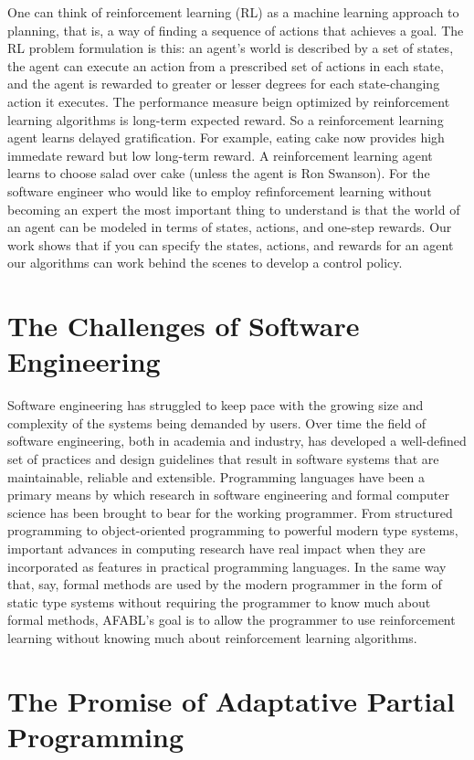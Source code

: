 One can think of reinforcement learning (RL) as a machine learning approach to planning, that is, a way of finding a sequence of actions that achieves a goal.  The RL problem formulation is this: an agent's world is described by a set of states, the agent can execute an action from a prescribed set of actions in each state, and the agent is rewarded to greater or lesser degrees for each state-changing action it executes. The performance measure beign optimized by reinforcement learning algorithms is long-term expected reward. So a reinforcement learning agent learns delayed gratification. For example, eating cake now provides high immedate reward but low long-term reward. A reinforcement learning agent learns to choose salad over cake (unless the agent is Ron Swanson). For the software engineer who would like to employ refinforcement learning without becoming an expert the most important thing to understand is that the world of an agent can be modeled in terms of states, actions, and one-step rewards. Our work shows that if you can specify the states, actions, and rewards for an agent our algorithms can work behind the scenes to develop a control policy.

\section{The Challenges of Software Engineering}

Software engineering has struggled to keep pace with the growing size and complexity of the systems being demanded by users. Over time the field of software engineering, both in academia and industry, has developed a well-defined set of practices and design guidelines that result in software systems that are maintainable, reliable and extensible. Programming languages have been a primary means by which research in software engineering and formal computer science has been brought to bear for the working programmer. From structured programming to object-oriented programming to powerful modern type systems, important advances in computing research have real impact when they are incorporated as features in practical programming languages. In the same way that, say, formal methods are used by the modern programmer in the form of static type systems without requiring the programmer to know much about formal methods, AFABL's goal is to allow the programmer to use reinforcement learning without knowing much about reinforcement learning algorithms.

\section{The Promise of Adaptative Partial Programming}

